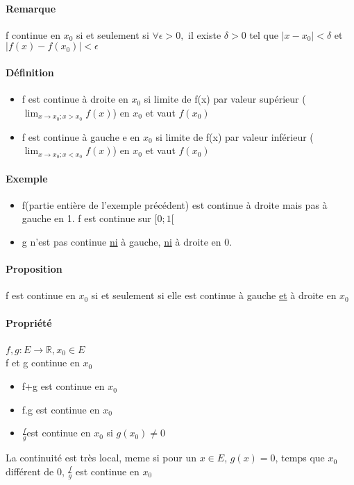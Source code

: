 \paragraph{Remarque} f continue en $x_0$ si et seulement si $\forall \epsilon > 0,$ il existe $\delta >0$ tel que $|x-x_0| < \delta$ et $|f(x) - f(x_0)| < \epsilon$

\paragraph{Définition} \begin{itemize}
\item f est continue à droite en $x_0$ si limite de f(x) par valeur supérieur (\begin{math} \lim_{x \to x_0; x > x_0} f(x) \end{math}) en $x_0$ et vaut $f(x_0)$
\item f est continue à gauche e en $x_0$ si limite de f(x) par valeur inférieur (\begin{math} \lim_{x \to x_0; x < x_0} f(x) \end{math}) en $x_0$ et vaut $f(x_0)$
\end{itemize}

\paragraph{Exemple} \begin{itemize}
	\item f(partie entière de l'exemple précédent) est continue à droite mais pas à gauche en 1. f est continue sur $[0; 1[$
	\item g n'est pas continue \ul{ni} à gauche, \ul{ni} à droite en 0.
\end{itemize}

\paragraph{Proposition} f est continue en $x_0$ si et seulement si elle est continue à gauche \ul{et} à droite en $x_0$
\paragraph{Propriété} $f, g : E \rightarrow \mathbb{R}, x_0 \in E$ ~\\
f et g continue en $x_0$ 

\begin{itemize}
	\item f+g est continue en $x_0$
	\item f.g est continue en $x_0$
	\item $\frac{f}{g} $est continue en $x_0$ si $g(x_0) \neq 0$
\end{itemize}
La continuité est très local, meme si pour un $x \in E$, $g(x) = 0$, temps que $x_0$ différent de 0, $\frac{f}{g}$ est continue en $x_0$

